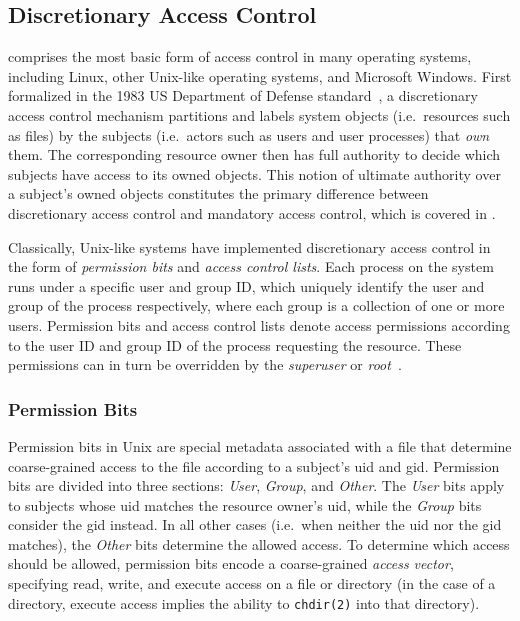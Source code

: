 \documentclass[
  fontsize=12pt,
  titlepage=firstiscover,
  paper=letter,
oneside,
  cleardoublepage=plain,
  parskip=half-,
  DIV=10,
  parindent,
  appendixprefix,
  chapterprefix,
  listof=totoc,
]{scrbook}
\begin{document}
\subsection{Discretionary Access Control}\label{ss:dac}

\textit{} comprises the most basic form of access
control in many operating systems, including Linux, other Unix-like operating systems, and
Microsoft Windows. First formalized in the 1983 US Department of Defense
standard~\cite{orange_book}, a discretionary access control mechanism partitions and
labels system objects (i.e.\ resources such as files) by the subjects (i.e.\ actors such as
users and user processes) that \textit{own} them. The corresponding resource owner then
has full authority to decide which subjects have access to its owned objects. This notion
of ultimate authority over a subject's owned objects constitutes the primary difference
between discretionary access control and mandatory access control, which is covered in
.

Classically, Unix-like systems have implemented discretionary access control in the form
of \textit{permission bits} and \textit{access control lists}. Each process on the system
runs under a specific user and group ID, which uniquely identify the user and group of the
process respectively, where each group is a collection of one or more users. Permission
bits and access control lists denote access permissions according to the user ID and group
ID of the process requesting the resource. These permissions can in turn be overridden by
the \textit{superuser} or \textit{root}~\cite{van_oorschot2020_tools_jewels,
jaeger2008_os_security}.

\subsubsection*{Permission Bits}

Permission bits in Unix are special metadata associated with a file that determine
coarse-grained access to the file according to a subject's \gls{uid} and \gls{gid}.
Permission bits are divided into three sections: \textit{User}, \textit{Group}, and
\textit{Other}. The \textit{User} bits apply to subjects whose \gls{uid} matches the
resource owner's \gls{uid}, while the \textit{Group} bits consider the \gls{gid} instead.
In all other cases (i.e.\ when neither the \gls{uid} nor the \gls{gid} matches), the
\textit{Other} bits determine the allowed access. To determine which access should be
allowed, permission bits encode a coarse-grained \textit{access vector}, specifying read,
write, and execute access on a file or directory (in the case of a directory, execute
access implies the ability to \texttt{chdir(2)} into that directory).
\end{document}
